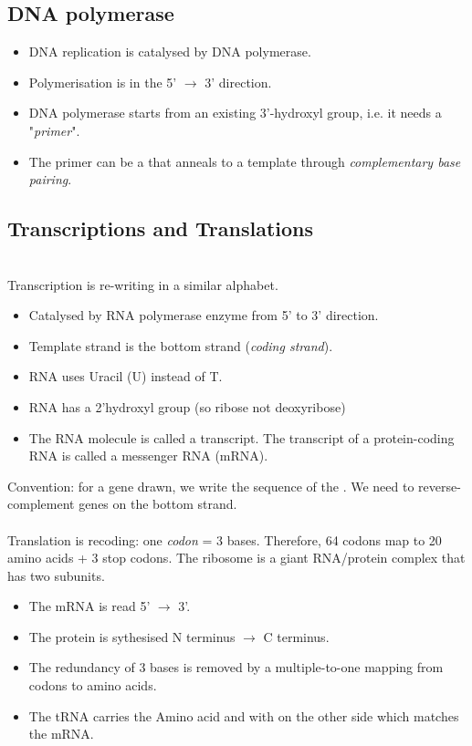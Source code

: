 \subsection{DNA polymerase}
\begin{itemize}
    \item DNA replication is catalysed by DNA polymerase.
    \item Polymerisation is in the 5' $\rightarrow$ 3' direction.
    \item DNA polymerase starts from an existing 3'-hydroxyl group, i.e. it needs a "\textit{primer}".
    \item The primer can be a  that anneals to a template through \textit{complementary base pairing}.
\end{itemize}
\newpage
\subsection{Transcriptions and Translations}
 \\ [.1in]
Transcription is re-writing in a similar alphabet.
\begin{itemize}
    \item Catalysed by RNA polymerase enzyme from 5' to 3' direction.
    \item Template strand is the bottom strand (\textit{coding strand}).
    \item RNA uses Uracil (U) instead of T.
    \item RNA has a 2'hydroxyl group (so ribose not deoxyribose)
    \item The RNA molecule is called a transcript. The transcript of a protein-coding RNA is called a messenger RNA (mRNA).
\end{itemize}
Convention: for a gene drawn, we write the sequence of the . We need to reverse-complement genes on the bottom strand.\\[.2in]
 \\ [.1in]
Translation is recoding: one \textit{codon} = 3 bases. Therefore, 64 codons map to 20 amino acids + 3 stop codons.  The ribosome is a giant RNA/protein complex that has two subunits.
\begin{itemize}
    \item The mRNA is read 5' $\rightarrow$ 3'.
    \item The protein is sythesised N terminus $\rightarrow$ C terminus.
    \item The redundancy of 3 bases is removed by a multiple-to-one mapping from codons to amino acids.
    \item The tRNA carries the Amino acid and with  on the other side which matches the mRNA. 
\end{itemize}
